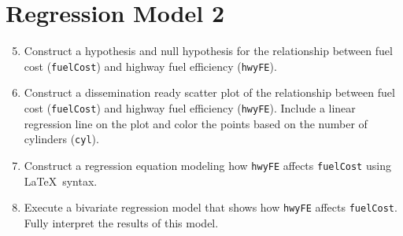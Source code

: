 \documentclass{tufte-handout}
\begin{document}
\vspace{3mm}
\section{Regression Model 2}
\begin{enumerate}
\setcounter{enumi}{4}
\item Construct a hypothesis and null hypothesis for the relationship between fuel cost (\texttt{fuelCost}) and highway fuel efficiency (\texttt{hwyFE}).
\item Construct a dissemination ready scatter plot of the relationship between fuel cost (\texttt{fuelCost}) and highway fuel efficiency (\texttt{hwyFE}). Include a linear regression line on the plot and color the points based on the number of cylinders (\texttt{cyl}). 
\item Construct a regression equation modeling how \texttt{hwyFE} affects \texttt{fuelCost} using \LaTeX{}\ syntax.
\item Execute a bivariate regression model that shows how \texttt{hwyFE} affects \texttt{fuelCost}. Fully interpret the results of this model.
\end{enumerate}


\end{document}
